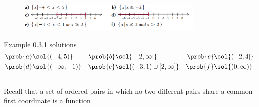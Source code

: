\documentclass{report}
\begin{document}
\bigbreak \noindent\bigbreak \noindent
  \begin{figure}[ht]
  \centering
  \includegraphics[width=0.8\textwidth]{ example3.png }
  \end{figure}
\pagebreak

\begin{problemset}{Example 0.3.1 solutions}
\begin{align*}
\prob{a} & \sol{(-4,5)}      & \prob{b} & \sol{[-2,\infty]}       & \prob{c} & \sol{(-2,4]}         \\
\prob{d} & \sol{(-\infty, -1)}  & \prob{e} & \sol{(-3,1) \cup [2,\infty]}  & \prob{f} & \sol{(0,\infty)}  
\end{align*}
\end{problemset}
\hrule
{}
\bigbreak \noindent
Recall that a set of ordered pairs in which no two different pairs share a common first coordinate is a function
\vspace{3mm}
\end{document}
